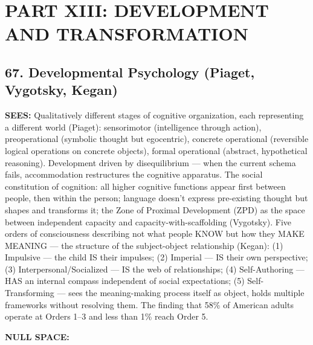 \section*{PART XIII: DEVELOPMENT AND TRANSFORMATION}


\subsection*{67. Developmental Psychology (Piaget, Vygotsky, Kegan)}


\textbf{SEES:} Qualitatively different stages of cognitive organization, each representing a different world (Piaget): sensorimotor (intelligence through action), preoperational (symbolic thought but egocentric), concrete operational (reversible logical operations on concrete objects), formal operational (abstract, hypothetical reasoning). Development driven by disequilibrium — when the current schema fails, accommodation restructures the cognitive apparatus. The social constitution of cognition: all higher cognitive functions appear first between people, then within the person; language doesn't express pre-existing thought but shapes and transforms it; the Zone of Proximal Development (ZPD) as the space between independent capacity and capacity-with-scaffolding (Vygotsky). Five orders of consciousness describing not what people KNOW but how they MAKE MEANING — the structure of the subject-object relationship (Kegan): (1) Impulsive — the child IS their impulses; (2) Imperial — IS their own perspective; (3) Interpersonal/\allowbreak Socialized — IS the web of relationships; (4) Self-Authoring — HAS an internal compass independent of social expectations; (5) Self-Transforming — sees the meaning-making process itself as object, holds multiple frameworks without resolving them. The finding that 58\% of American adults operate at Orders 1–3 and less than 1\% reach Order 5.


\textbf{NULL SPACE:}

